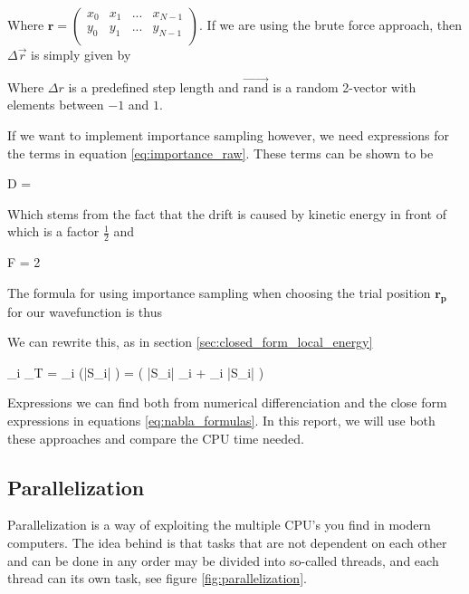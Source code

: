 Where $\mathbf{r} = \left ( \begin{matrix} x_0  & x_1 & ... & x_{N-1} \\ y_0  & y_1 & ... & y_{N-1} \\ \end{matrix}\right ) $. If we are using the brute force approach, then $\Delta \vec r$ is simply given by 

\eqs
{}
\eqf

Where $\Delta r$ is a predefined step length and $\vec {\textrm{rand}}$ is a random 2-vector with elements between $-1$ and $1$. 

If we want to implement importance sampling however, we need expressions for the terms in equation \ref{eq:importance_raw}.
These terms can be shown \cite{slides} to be 

\eqs
D = 
\eqf 

Which stems from the fact that the drift is caused by kinetic energy in front of which is a factor $\frac{1}{2}$ and 

\eqs
F = 2 
\eqf

The formula for using importance sampling when choosing the trial position $\mathbf{r_p}$ for our wavefunction is thus

\eqs
{}
\eqf

We can rewrite this, as in section \ref{sec:closed_form_local_energy}

\eqs
{} \nabla_i \Psi_T   =  \nabla_i (|S_i| \J)
= \left ( |S_i| \nabla_i \J + \J \nabla_i |S_i|  \right ) 
\eqf
\eqs
{}
\eqf

Expressions we can find both from numerical differenciation and the close form expressions in equations \ref{eq:nabla_formulas}.
In this report, we will use both these approaches and compare the CPU time needed. 


\subsection{Parallelization}

Parallelization is a way of exploiting the multiple CPU's you find in modern computers. 
The idea behind is that tasks that are not dependent on each other and can be done in any order may be divided into so-called threads, and each thread can its own task, see figure \ref{fig:parallelization}. 

